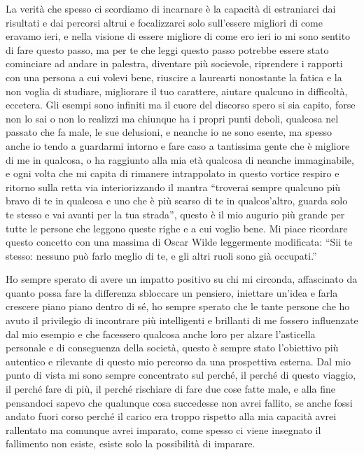\documentclass[12pt, a4paper]{report}
\begin{document}
La verità che spesso ci scordiamo di incarnare è la capacità di estraniarci dai risultati e dai percorsi altrui e focalizzarci solo sull'essere migliori di come eravamo ieri, e nella visione di essere migliore di come ero ieri io mi sono sentito di fare questo passo, ma per te che leggi questo passo potrebbe essere stato cominciare ad andare in palestra, diventare più socievole, riprendere i rapporti con una persona a cui volevi bene, riuscire a laurearti nonostante la fatica e la non voglia di studiare, migliorare il tuo carattere, aiutare qualcuno in difficoltà, eccetera. Gli esempi sono infiniti ma il cuore del discorso spero si sia capito, forse non lo sai o non lo realizzi ma chiunque ha i propri punti deboli, qualcosa nel passato che fa male, le sue delusioni, e neanche io ne sono esente, ma spesso anche io tendo a guardarmi intorno e fare caso a tantissima gente che è migliore di me in qualcosa, o ha raggiunto alla mia età qualcosa di neanche immaginabile, e ogni volta che mi capita di rimanere intrappolato in questo vortice respiro e ritorno sulla retta via interiorizzando il mantra ``troverai sempre qualcuno più bravo di te in qualcosa e uno che è più scarso di te in qualcos'altro, guarda solo te stesso e vai avanti per la tua strada'', questo è il mio augurio più grande per tutte le persone che leggono queste righe e a cui voglio bene. Mi piace ricordare questo concetto con una massima di Oscar Wilde leggermente modificata: ``Sii te stesso: nessuno può farlo meglio di te, e gli altri ruoli sono già occupati.''
\par
\vspace{\baselineskip}
Ho sempre sperato di avere un impatto positivo su chi mi circonda, affascinato da quanto possa fare la differenza sbloccare un pensiero, iniettare un'idea e farla crescere piano piano dentro di sé, ho sempre sperato che le tante persone che ho avuto il privilegio di incontrare più intelligenti e brillanti di me fossero influenzate dal mio esempio e che facessero qualcosa anche loro per alzare l'asticella personale e di conseguenza della società, questo è sempre stato l'obiettivo più autentico e rilevante di questo mio percorso da una prospettiva esterna. Dal mio punto di vista mi sono sempre concentrato sul perché, il perché di questo viaggio, il perché fare di più, il perché rischiare di fare due cose fatte male, e alla fine pensandoci sapevo che qualunque cosa succedesse non avrei fallito, se anche fossi andato fuori corso perché il carico era troppo rispetto alla mia capacità avrei rallentato ma comunque avrei imparato, come spesso ci viene insegnato il fallimento non esiste, esiste solo la possibilità di imparare.
\end{document}
